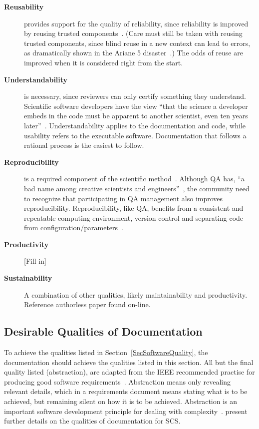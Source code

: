 \documentclass[12pt]{article}
\begin{document}
\begin{description}
\item [\textbf{Reusability}] provides support for the quality of reliability,
  since reliability is improved by reusing trusted components~\cite{Dubois2005}.
  (Care must still be taken with reusing trusted components, since blind reuse
  in a new context can lead to errors, as dramatically shown in the Ariane 5
  disaster~\cite[p.~37--38]{OliveiraAndStewart2006}.)  The odds of reuse are
  improved when it is considered right from the start.

\item [\textbf{Understandability}] is necessary, since reviewers can only certify
  something they understand.  Scientific software developers have the
  view ``that the science a developer embeds in the code must be apparent to
  another scientist, even ten years later''~\cite{Kelly2013}.
  Understandability applies to the documentation and code, while usability
  refers to the executable software.  Documentation that follows a rational
  process is the easiest to follow.

\item [\textbf{Reproducibility}] is a required component of the scientific
  method~\cite{Davison2012}.  Although QA has, ``a bad name among
  creative scientists and engineers''~\cite[p.~352]{Roache1998}, the community
  need to recognize that participating in QA management also improves
  reproducibility.  Reproducibility, like QA, benefits from a consistent and
  repeatable computing environment, version control and separating code from
  configuration/parameters~\cite{Davison2012}.

\item [\textbf{Productivity}] [Fill in]

\item [\textbf{Sustainability}] A combination of other qualities, likely
  maintainability and productivity.  Reference authorless paper found on-line.

\end{description}

\subsection{Desirable Qualities of Documentation} \label{SecDesirableQs}

To achieve the qualities listed in Section~\ref{SecSoftwareQuality}, the
documentation should achieve the qualities listed in this section.  All but the
final quality listed (abstraction), are adapted from the IEEE recommended
practise for producing good software requirements~\cite{IEEE1998}.  Abstraction
means only revealing relevant details, which in a requirements document means
stating what is to be achieved, but remaining silent on how it is to be
achieved.  Abstraction is an important software development principle for
dealing with complexity~\cite[p.~40]{GhezziEtAl2003}.
\citet{SmithAndKoothoor2016} present further details on the qualities of
documentation for SCS.
\end{document}
